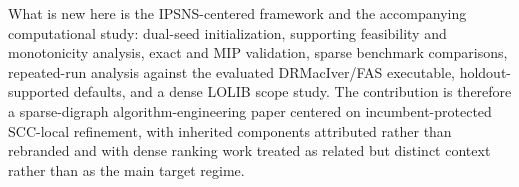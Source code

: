 What is new here is the IPSNS-centered framework and the accompanying computational study: dual-seed initialization, supporting feasibility and monotonicity analysis, exact and MIP validation, sparse benchmark comparisons, repeated-run analysis against the evaluated DRMacIver/FAS executable, holdout-supported defaults, and a dense LOLIB scope study. The contribution is therefore a sparse-digraph algorithm-engineering paper centered on incumbent-protected SCC-local refinement, with inherited components attributed rather than rebranded and with dense ranking work treated as related but distinct context rather than as the main target regime.
